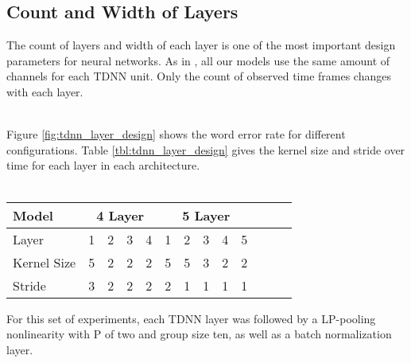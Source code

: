 \subsection{Count and Width of Layers}
The count of layers and width of each layer is one of the most important design parameters for neural networks. As in \cite{peddinti2015reverberation}, all our models use the same amount of channels for each TDNN unit. Only the count of observed time frames changes with each layer. \\ \\
\begin{minipage}{\linewidth}
	\label{fig:tdnn_layer_design}
\end{minipage}
Figure \ref{fig:tdnn_layer_design} shows the word error rate for different configurations. Table \ref{tbl:tdnn_layer_design} gives the kernel size and stride over time for each layer in each architecture. \\ \\
\begin{minipage}{\linewidth}
	\centering 
	\begin{tabular} {|l | c | c | c | c | c | c | c | c | c | c | c | c |}
	\hline
	Model & \multicolumn{4}{c|}{4 Layer} & \multicolumn{5}{c|}{5 Layer} \\
	\hline
	Layer & 1 & 2 & 3 & 4 & 1 & 2 & 3 & 4 & 5 \\
	\hline
	Kernel Size & 5 & 2 & 2 & 2 & 5 & 5 & 3 & 2 & 2 \\
	\hline
	Stride & 3 & 2 & 2 & 2 & 2 & 1 & 1 & 1 & 1 \\
	\hline
	\end{tabular}
	\label{tbl:tdnn_layer_design}
\end{minipage}
For this set of experiments, each TDNN layer was followed by a LP-pooling nonlinearity with P of two and group size ten, as well as a batch normalization layer.
